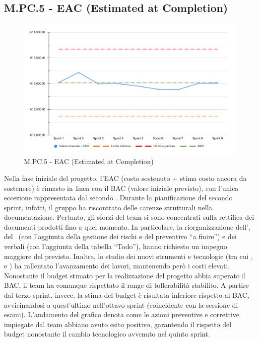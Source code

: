 \subsection{M.PC.5 - EAC (Estimated at Completion)}
\begin{figure}[H]
    \centering
    \includegraphics[width=\textwidth]{assets/stima_a_finire.pdf}
    \caption{M.PC.5 - EAC (Estimated at Completion)}
\end{figure}

\par Nella fase iniziale del progetto, l'EAC (costo sostenuto + stima costo ancora da sostenere) è rimasto in linea con il BAC (valore iniziale previsto), con l’unica eccezione rappresentata dal secondo . Durante la pianificazione del secondo sprint, infatti, il gruppo ha riscontrato delle carenze strutturali nella documentazione. Pertanto, gli sforzi del team si sono concentrati sulla rettifica dei documenti prodotti fino a quel momento. In particolare, la riorganizzazione dell'\AdR, del \PdP\ (con l'aggiunta della gestione dei rischi e del preventivo “a finire”) e dei verbali (con l’aggiunta della tabella “Todo”), hanno richiesto un impegno maggiore del previsto. Inoltre, lo studio dei nuovi strumenti e tecnologie (tra cui ,  e ) ha rallentato l’avanzamento dei lavori, mantenendo però i costi elevati. Nonostante il budget stimato per la realizzazione del progetto abbia superato il BAC, il team ha comunque rispettato il range di tollerabilità stabilito. A partire dal terzo sprint, invece, la stima del budget è risultata inferiore rispetto al BAC, avvicinandosi a quest’ultimo nell’ottavo sprint (coincidente con la sessione di esami). L’andamento del grafico denota come le azioni preventive e correttive impiegate dal team abbiano avuto esito positivo, garantendo il rispetto del budget nonostante il cambio tecnologico avvenuto nel quinto sprint.